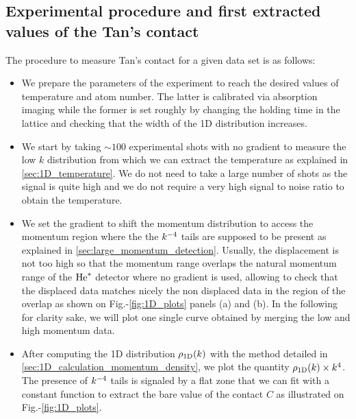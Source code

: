 \subsection{Experimental procedure and first extracted values of the Tan's contact}

The procedure to measure Tan's contact for a given data set is as follows:

\begin{itemize}
    \item We prepare the parameters of the experiment to reach the desired values of temperature and atom number. The latter is calibrated via absorption imaging while the former is set roughly by changing the holding time in the lattice and checking that the width of the 1D distribution increases. 
    \item We start by taking $\sim 100$ experimental shots with no gradient to measure the low $k$ distribution from which we can extract the temperature as explained in \ref{sec:1D_temperature}. We do not need to take a large number of shots as the signal is quite high and we do not require a very high signal to noise ratio to obtain the temperature.
    \item We set the gradient to shift the momentum distribution to access the momentum region where the the $k^{-4}$ tails are supposed to be present as explained in \ref{sec:large_momentum_detection}. Usually, the displacement is not too high so that the momentum range overlaps the natural momentum range of the $\mathrm{He}^*$ detector where no gradient is used, allowing to check that the displaced data matches nicely the non displaced data in the region of the overlap as shown on Fig.-\ref{fig:1D_plots} panels (a) and (b). In the following for clarity sake, we will plot one single curve obtained by merging the low and high momentum data.
    \item After computing the 1D distribution $\rho_{\rm{1D}} (k)$ with the method detailed in \ref{sec:1D_calculation_momentum_density}, we plot the quantity $\rho_{\rm{1D}} (k) \times k^4$. The presence of $k^{-4}$ tails is signaled by a flat zone that we can fit with a constant function to extract the bare value of the contact $C$ as illustrated on Fig.-\ref{fig:1D_plots}.

    
\end{itemize}  
    
